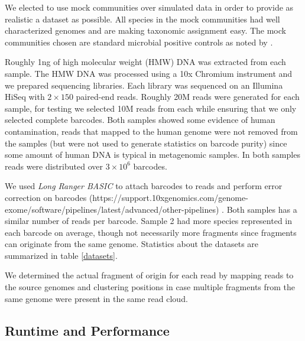 We elected to use mock communities over simulated data in order to provide as realistic a dataset as possible. All species in the mock communities had well characterized genomes and are making taxonomic assignment easy. The mock communities chosen are standard microbial positive controls as noted by \citep{Mason2017}.

Roughly 1ng of high molecular weight (HMW) DNA was extracted from each sample. The HMW DNA was processed using a 10x Chromium instrument and we prepared sequencing libraries. Each library was sequenced on an Illumina HiSeq with $2 \times 150$ paired-end reads. Roughly 20M reads were generated for each sample, for testing we selected 10M reads from each while ensuring that we only selected complete barcodes. Both samples showed some evidence of human contamination, reads that mapped to the human genome were not removed from the samples (but were not used to generate statistics on barcode purity) since some amount of human DNA is typical in metagenomic samples. In both samples reads were distributed over $3 \times 10^6$ barcodes. 

We used \textit{Long Ranger BASIC} to attach barcodes to reads and perform error correction on barcodes (https://support.10xgenomics.com/genome-exome/software/pipelines/latest/advanced/other-pipelines) . Both samples has a similar number of reads per barcode. Sample 2 had more species represented in each barcode on average, though not necessarily more fragments since fragments can originate from the same genome. Statistics about the datasets are summarized in table \ref{datasets}. %

We determined the actual fragment of origin for each read by mapping reads to the source genomes and clustering positions in case multiple fragments from the same genome were present in the same read cloud.

\subsection*{Runtime and Performance}

